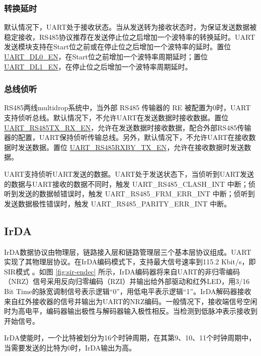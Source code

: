 \documentclass[main\_\_CN.tex]{subfiles}
\begin{document}
\subsubsection{转换延时}\label{sec:uart-turnaround-delay}

默认情况下，UART处于接收状态。当从发送转为接收状态时，为保证发送数据被稳定接收，RS485协议推荐在发送停止位之后增加一个波特率的转换延时。UART发送模块支持在Start位之前或在停止位之后增加一个波特率的延时。置位\hyperref[fielddesc:UARTDL0EN]{UART\_DL0\_EN}，在Start位之前增加一个波特率周期延时；置位 \hyperref[fielddesc:UARTDL1EN]{UART\_DL1\_EN}，在停止位之后增加一个波特率周期延时。

\subsubsection{总线侦听}

RS485两线multidrop系统中，当外部 RS485 传输器的 RE 被配置为0时，UART支持侦听总线。默认情况下，不允许UART在发送数据时接收数据。置位\hyperref[fielddesc:UARTRS485TXRXEN]{UART\_RS485TX\_RX\_EN}，允许在发送数据时接收数据，配合外部RS485传输器的配置，UART保持侦听传输总线。另外，默认情况下，不允许UART在接收数据时发送数据。置位 \hyperref[fielddesc:UARTRS485RXBYTXEN]{UART\_RS485RXBY\_TX\_EN}，允许在接收数据时发送数据。

UART支持侦听UART发送的数据。UART处于发送状态下，当侦听到UART发送的数据与UART接收的数据不同时，触发 UART\_RS485\_CLASH\_INT 中断；侦听到发送的数据帧错误时，触发 UART\_RS485\_FRM\_ERR\_INT 中断；侦听到发送数据极性错误时，触发 UART\_RS485\_PARITY\_ERR\_INT 中断。

\subsection{IrDA} \label{sub:uart-func-desc-irda}

IrDA数据协议由物理层，链路接入层和链路管理层三个基本层协议组成。UART实现了其物理层协议。在IrDA编码模式下，支持最大信号速率到115.2 Kbit/s，即SIR模式 。如图 \ref{fig:sir-endec} 所示，IrDA编码器将来自UART的非归零编码（NRZ）信号采用反向归零编码（RZI）并输出给外部驱动和红外LED，用3/16 Bit Time的脉宽调制信号表示逻辑“0”，用低电平表示逻辑“1”。IrDA解码器接收来自红外接收器的信号并输出为UART的NRZ编码。一般情况下，接收端信号空闲时为高电平，编码器输出极性与解码器输入极性相反。当检测到低脉冲表示接收到开始信号。

IrDA使能时，一个比特被划分为16个时钟周期，在其第9、10、11个时钟周期中，当需要发送的比特为0时，IrDA输出为高。
\end{document}
